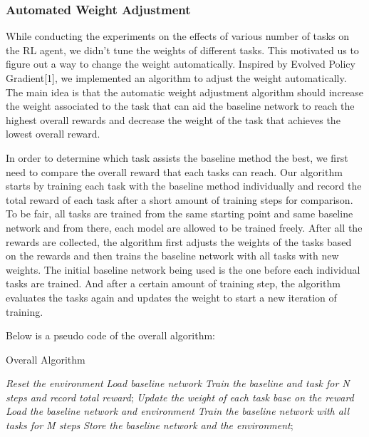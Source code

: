 \documentclass[12pt,twocolumn,letterpaper]{article}
\begin{document}
\subsubsection{Automated Weight Adjustment}
While conducting the experiments on the effects of various number of tasks on the RL agent, we didn’t tune the weights of different tasks. This motivated us to figure out a way to change the weight automatically. Inspired by Evolved Policy Gradient[1], we implemented an algorithm to adjust the weight automatically. The main idea is that the automatic weight adjustment algorithm should increase the weight associated to the task that can aid the baseline network to reach the highest overall rewards and decrease the weight of the task that achieves the lowest overall reward. 

In order to determine which task assists the baseline method the best, we first need to compare the overall reward that each tasks can reach. Our algorithm starts by training each task with the baseline method individually and record the total reward of each task after a short amount of training steps for comparison. To be fair, all tasks are trained from the same starting point and same baseline network and from there, each model are allowed to be trained freely. After all the rewards are collected, the algorithm first adjusts the weights of the tasks based on the rewards and then trains the baseline network with all tasks with new weights. The initial baseline network being used is the one before each individual tasks are trained. And after a certain amount of training step, the algorithm evaluates the tasks again and updates the weight to start a new iteration of training. 

Below is a pseudo code of the overall algorithm:
\begin{algorithm}[H]
\caption{Overall Algorithm}\label{euclid}
\begin{algorithmic}[1]
\Procedure{}{}
    
			\State \textit{Reset the environment}
			\State \textit{Load baseline network}
			\State \textit{Train the baseline and task for N steps and record total reward};
		\EndFor{}
	\State \textit{Update the weight of each task base on the reward}
	\State \textit{Load the baseline network and environment}
	\State \textit{Train the baseline network with all tasks for M steps}
	\State \textit{Store the baseline network and the environment};
	\EndFor{}

\EndProcedure
\end{algorithmic}
\end{algorithm}
\end{document}
